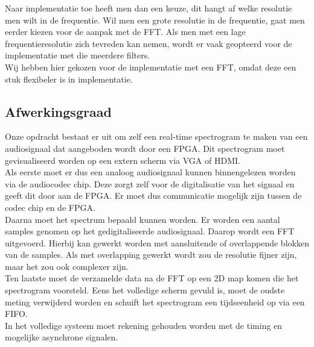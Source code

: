 \documentclass[a4paper,kul]{kulakarticle} %
\begin{document}
Naar implementatie toe heeft men dan een keuze, dit hangt af welke resolutie men wilt in de frequentie. Wil men een grote resolutie in de frequentie, gaat men eerder kiezen voor de aanpak met de FFT. Als men met een lage frequentieresolutie zich tevreden kan nemen, wordt er vaak geopteerd voor de implementatie met die meerdere filters.\\
Wij hebben hier gekozen voor de implementatie met een FFT, omdat deze een stuk flexibeler is in implementatie.


\subsection{Afwerkingsgraad}

Onze opdracht bestaat er uit om zelf een real-time spectrogram te maken van een audiosignaal dat aangeboden wordt door een FPGA. Dit spectrogram moet gevisualiseerd worden op een extern scherm via VGA of HDMI. \\

Als eerste moet er dus een analoog audiosignaal kunnen binnengelezen worden via de audiocodec chip. Deze zorgt zelf voor de digitalisatie van het signaal en geeft dit door aan de FPGA. Er moet dus communicatie mogelijk zijn tussen de codec chip en de FPGA. \\
Daarna moet het spectrum bepaald kunnen worden. Er worden een aantal samples genomen op het gedigitaliseerde audiosignaal. Daarop wordt een FFT uitgevoerd. Hierbij kan gewerkt worden met aansluitende of overlappende blokken van de samples. Als met overlapping gewerkt wordt zou de resolutie fijner zijn, maar het zou ook complexer zijn. \\
Ten laatste moet de verzamelde data na de FFT op een 2D map komen die het spectrogram voorsteld. Eens het volledige scherm gevuld is, moet de oudste meting verwijderd worden en schuift het spectrogram een tijdseenheid op via een FIFO. \\

In het volledige systeem moet rekening gehouden worden met de timing en mogelijke asynchrone signalen. \\
\end{document}
